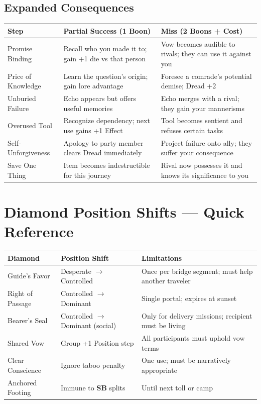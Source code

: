 \documentclass[11pt]{article}
\newcommand{\Term}[1]{\textbf{#1}}
\newcommand{\SB}{\Term{SB}}
\begin{document}
\subsection*{Expanded Consequences}
\begin{tabularx}{\linewidth}{@{}l X X@{}}
\toprule
\textbf{Step} & \textbf{Partial Success (1 Boon)} & \textbf{Miss (2 Boons + Cost)}\\
\midrule
Promise Binding & Recall who you made it to; gain +1 die vs that person & Vow becomes audible to rivals; they can use it against you\\
Price of Knowledge & Learn the question's origin; gain lore advantage & Foresee a comrade's potential demise; Dread +2\\
Unburied Failure & Echo appears but offers useful memories & Echo merges with a rival; they gain your mannerisms\\
Overused Tool & Recognize dependency; next use gains +1 Effect & Tool becomes sentient and refuses certain tasks\\
Self-Unforgiveness & Apology to party member clears Dread immediately & Project failure onto ally; they suffer your consequence\\
Save One Thing & Item becomes indestructible for this journey & Rival now possesses it and knows its significance to you\\
\bottomrule
\end{tabularx}

\section{Diamond Position Shifts --- Quick Reference}
\label{app:diamonds}
\begin{tabularx}{\linewidth}{@{}l l X@{}}
\toprule
\textbf{Diamond} & \textbf{Position Shift} & \textbf{Limitations}\\
\midrule
Guide's Favor & Desperate $\rightarrow$ Controlled & Once per bridge segment; must help another traveler\\
Right of Passage & Controlled $\rightarrow$ Dominant & Single portal; expires at sunset\\
Bearer's Seal & Controlled $\rightarrow$ Dominant (social) & Only for delivery missions; recipient must be living\\
Shared Vow & Group +1 Position step & All participants must uphold vow terms\\
Clear Conscience & Ignore taboo penalty & One use; must be narratively appropriate\\
Anchored Footing & Immune to \SB{} splits & Until next toll or camp\\
\bottomrule
\end{tabularx}
\end{document}
